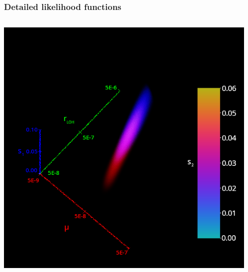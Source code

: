 \documentclass{beamer}
\begin{document}
\begin{frame}
    \frametitle{Detailed likelihood functions}
    \begin{columns}
        \begin{column}{0.5\textwidth}
        \includegraphics[width=\textwidth]{figures/videokey.png}
        \end{column}
        \begin{column}{0.5\textwidth}
        \end{column}
    \end{columns}
\end{frame}
\end{document}
